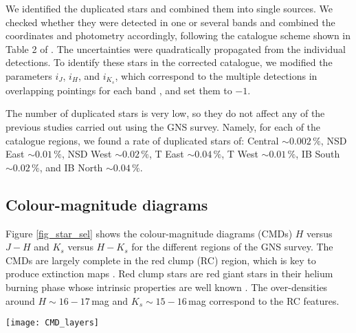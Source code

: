 \documentclass{aa}
\begin{document}
We identified the duplicated stars and combined them into single sources. We checked whether they were detected in one or several bands and combined the coordinates and photometry accordingly, following the catalogue scheme shown in Table 2 of \citet{Nogueras-Lara:2019aa}. The uncertainties were quadratically propagated from the individual detections. To identify these stars in the corrected catalogue, we modified the parameters $i_J$, $i_H$, and $i_{K_s}$, which correspond to the multiple detections in overlapping pointings for each band \citep[see Sect. 4.4 for further details; ][]{Nogueras-Lara:2019aa}, and set them to $-1$.


The number of duplicated stars is very low, so they do not affect any of the previous studies carried out using the GNS survey. Namely, for each of the catalogue regions, we found a rate of duplicated stars of: Central $\sim0.002\,\%$,  NSD East $\sim0.01\,\%$, NSD West $\sim0.02\,\%$, T East $\sim0.04\,\%$, T West $\sim0.01\,\%$, IB South $\sim0.02\,\%$, and IB North $\sim0.04\,\%$.



\subsection{Colour-magnitude diagrams}
\label{contamination}

Figure \ref{fig_star_sel} shows the colour-magnitude diagrams (CMDs) $H$ versus $J-H$ and $K_s$ versus $H-K_s$ for the different regions of the GNS survey. The CMDs are largely complete in the red clump (RC) region, which is key to produce extinction maps \citep[e.g.][]{Nogueras-Lara:2018aa,Nogueras-Lara:2020aa}. Red clump stars are red giant stars in their helium burning phase whose intrinsic properties are well known \citep[e.g.][]{Girardi:2016fk}. The over-densities around $H\sim 16-17$\,mag and $K_s\sim15-16$\,mag correspond to the RC features.

    

   \begin{figure*}
   \texttt{[image: CMD\_layers]}
   \caption{Colour-magnitude diagrams for each region of the GNS survey. The dashed lines represent the cuts applied in this work between the foreground population (in blue) and stars that we consider to lie inside the GC, behind two different layers of extinction (orange and red). The extinction layers were selected following the methodology explained in Sect.\,\ref{sel_criterion}. The dashed rectangles indicate the selection of reference stars (mainly RC stars) to create the extinction maps.  Only two layers are defined for the IBN and IBS regions. The low number of stars present for the NSD W region is due to the lower than average quality of the data for that region. Given the high number of stars, only a fraction of them is represented to not overcrowd the plots.}

   \label{fig_star_sel}
    \end{figure*}
\end{document}
